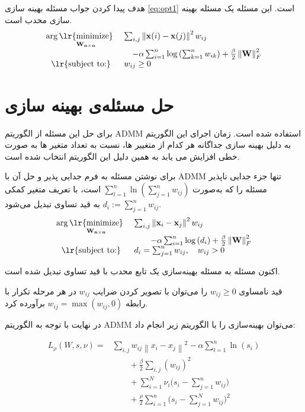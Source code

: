 \documentclass[10pt,twocolumn,a4paper]{article}
\newcommand\minimize[1]{\mathop{\text{\lr{minimize}}}\limits_{#1}\ }
\begin{document}
	هدف پیدا کردن جواب مسئله بهینه سازی
	\ref{eq:opt1}
	است. این مسئله یک مسئله بهینه سازی محدب است. 
	\begin{equation}\label{eq:opt1}
		\begin{array}{cl}
			\arg \minimize{\mathbf{W_{n \times n}}} &\sum_{i,j} \left\| \mathbf{x}(i) - \mathbf{x}(j) \right\|^2 w_{ij} \\ &\quad - \alpha \sum_{i=1}^{n} \log \left( \sum_{k=1}^{n} w_{ik} \right) + \frac{\beta}{2} \left\| \mathbf{W} \right\|_F^2 \\
			\text{\lr{subject to:}} & w_{ij} \geq 0
		\end{array}
	\end{equation}
	\section{حل مسئله‌ی بهینه سازی} \label{sec:optsol}
	
	برای حل این مسئله از الگوریتم ADMM استفاده شده است. زمان اجرای این الگوریتم به دلیل بهینه سازی جداگانه هر کدام از متغییر ها، نسبت به تعداد متغیر ها به صورت خطی افزایش می یابد به همین دلیل این الگوریتم انتخاب شده است.
	
	برای نوشتن مسئله به فرم جدایی پذیر و حل آن با ADMM تنها جزء جدایی ناپذیر
	مسئله را که به‌صورت
	$
	\sum_{l=1}^{n} \ln \left( \sum_{j=1}^{n} w_{ij} \right)
	$
	است، با تعریف متغیر کمکی 	$d_i := \sum_{j=1}^{n} w_{ij}$	به قید تساوی تبدیل می‌شود.\\
	\begin{equation}\label{eq:opt2}
		\begin{array}{cl}
			\arg \minimize{\mathbf{W_{n \times n}}}&\sum_{i,j} \left\| \mathbf{x}_i - \mathbf{x}_j \right\|^2 w_{ij}
			\\&\qquad- \alpha \sum_{i=1}^{n} \log \left( d_i \right) + \frac{\beta}{2} \left\| \mathbf{W} \right\|_F^2 \\
			\text{\lr{subject to:}} &d_i = \sum_{j=1}^{n} w_{ij}, \quad w_{ij} > 0
		\end{array}
	\end{equation}
	
	اکنون مسئله به مسئله بهینه‌سازی یک تابع محدب با قید تساوی تبدیل شده است.
	
	قید نامساوی $w_{ij} \geq 0$ را می‌توان با تصویر کردن ضرایب \( w_{ij} \)
	در هر مرحله تکرار با رابطه $w_{ij} = \max(w_{ij}, 0)$ برآورده کرد.
	
	در نهایت با توجه به الگوریتم ADMM می‌توان بهینه‌سازی را با الگوریتم زیر انجام داد:
	
	\begin{equation}\label{eq:opt3}
		\begin{array}{cl}
			L_{\rho} (W, s, \nu) = &\sum_{i,j} w_{ij} \left\| x_i - x_j \right\|^2 - \alpha \sum_{l=1}^{n} \ln (s_i) \\
			&\qquad+ \frac{\beta}{2} \sum_{i,j} (w_{ij})^2 \\
			&\qquad+ \sum_{i=1}^{N} \nu_i \big( s_i - \sum_{j=1}^{n} w_{ij} \big)\\
			&\qquad+ \frac{\rho}{2} \sum_{i=1}^{n} \big( s_i - \sum_{j=1}^{N} w_{ij} \big)^2
		\end{array}
	\end{equation}
	
\end{document}
